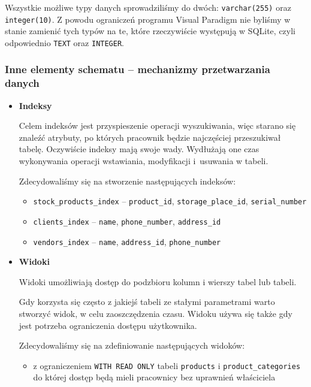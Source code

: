 Wszystkie możliwe typy danych sprowadziliśmy do dwóch: \lstinline[style=SQLite]|varchar(255)| oraz \lstinline[style=SQLite]|integer(10)|. Z powodu ograniczeń programu Visual Paradigm nie byliśmy w stanie zamienić tych typów na te, które rzeczywiście występują w SQLite, czyli odpowiednio \lstinline[style=SQLite]|TEXT| oraz \lstinline[style=SQLite]|INTEGER|.

\subsubsection{Inne elementy schematu – mechanizmy przetwarzania danych}

\begin{itemize}
	
	\item \textbf{Indeksy}
	
	Celem indeksów jest przyspieszenie operacji wyszukiwania, więc starano się znaleźć atrybuty, po których pracownik będzie najczęściej przeszukiwał tabelę. Oczywiście indeksy mają swoje wady. Wydłużają one czas wykonywania operacji wstawiania, modyfikacji i~usuwania w tabeli.
	
	Zdecydowaliśmy się na stworzenie następujących indeksów:
	
	\begin{itemize}
		
		\item \lstinline|stock_products_index| – \lstinline|product_id|, \lstinline|storage_place_id|, \lstinline|serial_number|
		
		\item \lstinline|clients_index| – \lstinline|name|, \lstinline|phone_number|, \lstinline|address_id|
		
		\item \lstinline|vendors_index| – \lstinline|name|, \lstinline|address_id|, \lstinline|phone_number|
		
	\end{itemize}
	
	\item \textbf{Widoki}
	
	Widoki umożliwiają dostęp do podzbioru kolumn i wierszy tabel lub tabeli.
	
	Gdy korzysta się często z jakiejś tabeli ze stałymi parametrami warto stworzyć widok, w celu zaoszczędzenia czasu. Widoku używa się także gdy jest potrzeba ograniczenia dostępu użytkownika.
	
	Zdecydowaliśmy się na zdefiniowanie następujących widoków:
	
	\begin{itemize}
		
		\item  z ograniczeniem \lstinline|WITH READ ONLY| tabeli \lstinline|products| i \lstinline|product_categories| do której dostęp będą mieli pracownicy bez uprawnień właściciela
		
	\end{itemize}
	
\end{itemize}

